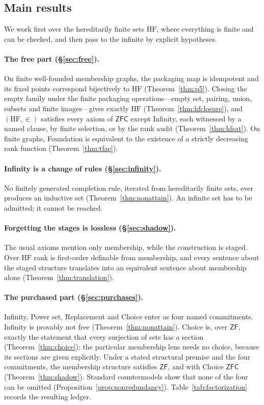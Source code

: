 \documentclass[11pt]{article}
\newcommand{\HF}{\mathrm{HF}}                 \newcommand{\rank}{\operatorname{rank}}
\theoremstyle{definition}
\begin{document}
\subsection{Main results}

We work first over the hereditarily finite sets $\HF$, where everything is finite and can be
checked, and then pass to the infinite by explicit hypotheses.

\paragraph{The free part (\S\ref{sec:free}).} On finite well-founded membership graphs, the
packaging map is idempotent and its fixed points correspond bijectively to $\HF$
(Theorem~\ref{thm:p5}). Closing the empty family under the finite packaging operations---empty
set, pairing, union, subsets and finite images---gives exactly $\HF$ (Theorem~\ref{thm:hfclosure}),
and $(\HF,\in)$ satisfies every axiom of $\mathsf{ZFC}$ except Infinity, each witnessed by a
named clause, by finite selection, or by the rank audit (Theorem~\ref{thm:hfsat}). On finite graphs, Foundation is
equivalent to the existence of a strictly decreasing rank function (Theorem~\ref{thm:tfae}).

\paragraph{Infinity is a change of rules (\S\ref{sec:infinity}).} No finitely generated
completion rule, iterated from hereditarily finite sets, ever produces an inductive set
(Theorem~\ref{thm:nonattain}). An infinite set has to be admitted; it cannot be reached.

\paragraph{Forgetting the stages is lossless (\S\ref{sec:shadow}).} The usual axioms mention
only membership, while the construction is staged. Over $\HF$ rank is first-order definable from
membership, and every sentence about the staged structure translates into an equivalent sentence
about membership alone (Theorem~\ref{thm:translation}).

\paragraph{The purchased part (\S\ref{sec:purchases}).} Infinity, Power set, Replacement and
Choice enter as four named commitments. Infinity is provably not free
(Theorem~\ref{thm:nonattain}). Choice is, over $\mathsf{ZF}$, exactly the statement that every
surjection of sets has a section (Theorem~\ref{thm:choice}); the particular membership lens needs
no choice, because its sections are given explicitly. Under a stated structural premise and the
four commitments, the membership structure satisfies $\mathsf{ZF}$, and with Choice $\mathsf{ZFC}$
(Theorem~\ref{thm:shadow}). Standard countermodels show that none of the four can be omitted
(Proposition~\ref{prop:nonredundancy}). Table~\ref{tab:factorization} records the resulting
ledger.
\end{document}
